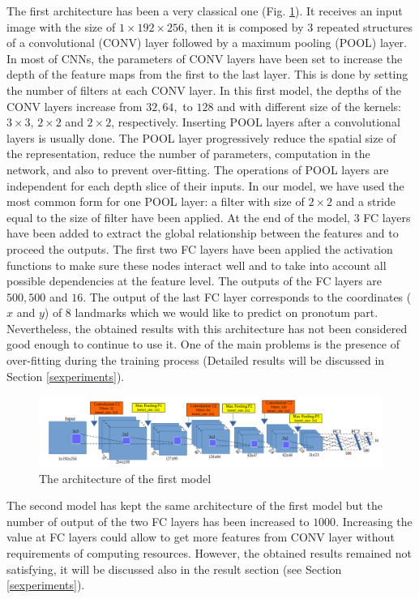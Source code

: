 \documentclass[review]{elsarticle}
\begin{document}
The first architecture has been a very classical one
(Fig. \ref{fignet1}). It receives an input image with the size of $1
\times 192 \times 256$, then it is composed by $3$ repeated structures
of a convolutional (CONV) layer followed by a maximum pooling (POOL)
layer. In most of CNNs, the parameters of CONV layers have been set to
increase the depth of the feature maps from the first  to the last
layer. This is done by setting the number of filters at each CONV
layer. In this first model, the depths of the CONV layers increase
from $32, 64, $ to $128$ and with different size of the kernels: $3
\times 3$, $2 \times 2$ and $2 \times 2$, respectively. Inserting POOL
layers after a convolutional layers is usually done. The POOL layer
progressively reduce the spatial size of the representation, reduce
the number of parameters, computation in the network, and also to
prevent over-fitting. The operations of POOL layers are independent
for each depth slice of their inputs. In our model, we have used the
most common form for one POOL layer: a filter with size of $2 \times
2$ and a stride equal to the size of filter have been applied. At the
end of the model, $3$ FC layers have been added to extract the global
relationship between the features and to proceed the outputs. The
first two FC layers have been applied the activation functions to make
sure these nodes interact well and to take into account all possible
dependencies at the feature level. The outputs of the FC layers are
$500, 500$ and $16$. The output of the last FC layer corresponds to
the coordinates ($x$ and $y$) of $8$ landmarks which we would like to
predict on pronotum part. Nevertheless, the obtained results with this
architecture has not been considered good enough to continue to use
it. One of the main problems is the presence of over-fitting during
the training process (Detailed results will be discussed in Section
\ref{sexperiments}).

\begin{figure}[!h]
	\centering
	\includegraphics[scale=0.3]{images/net1}
	\caption{The architecture of the first model}
	\label{fignet1}
\end{figure}

The second model has kept the same architecture of the first model but
the number of output of the two FC layers has been increased to
$1000$. Increasing the value at FC layers could allow to get more
features from CONV layer without requirements of computing
resources. However, the obtained results remained not satisfying, it
will be discussed also in the result section (see Section
\ref{sexperiments}).
\end{document}
